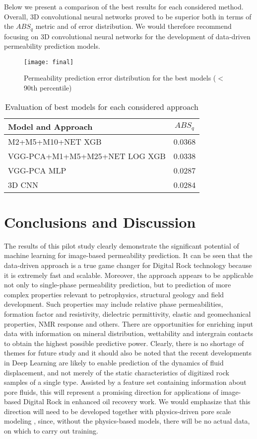 \documentclass[review]{elsarticle}
\begin{document}
Below we present a comparison of the best results for each considered method. Overall, 3D convolutional neural networks proved to be superior both in terms of the $ABS_q$ metric and of error distribution. We would therefore recommend focusing on 3D convolutional neural networks for the development of data-driven permeability prediction models.

\begin{figure}[H]
    \centering
  \texttt{[image: final]}
    \caption{Permeability prediction error distribution for the best models ($<$ 90th percentile)}
\end{figure}

\begin{table}[H]
  \centering
  \caption{Evaluation of best models for each considered approach} \label{tab:tab7}
  \begin{tabular}{ | l | c | }
    \hline
    Model and Approach & $ABS_q$ \\ \hline
    M2+M5+M10+NET XGB & 0.0368 \\ \hline
    VGG-PCA+M1+M5+M25+NET LOG XGB & 0.0338 \\ \hline
    VGG-PCA MLP & 0.0287 \\ \hline
    3D CNN & 0.0284 \\ \hline
  \end{tabular}
\end{table}

\section{Conclusions and Discussion}

The results of this pilot study clearly demonstrate the significant potential of machine learning for image-based permeability prediction. It can be seen that the data-driven approach is a true game changer for Digital Rock technology because it is extremely fast and scalable. Moreover, the approach appears to be applicable not only to single-phase permeability prediction, but to prediction of more complex properties relevant to petrophysics, structural geology and field development. Such properties may include relative phase permeabilities, formation factor and resistivity, dielectric permittivity, elastic and geomechanical properties, NMR response and others. There are opportunities for enriching input data with information on mineral distribution, wettability and intergrain contacts to obtain the highest possible predictive power.
Clearly, there is no shortage of themes for future study and it should also be noted that the recent developments in Deep Learning are likely to enable prediction of the dynamics of fluid displacement, and not merely of the static characteristics of digitized rock samples of a single type. Assisted by a feature set containing information about pore fluids, this will represent a promising direction for applications of image-based Digital Rock in enhanced oil recovery work. We would emphasize that this direction will need to be developed together with physics-driven pore scale modeling \cite{koroteev2014direct}, since, without the physics-based models, there will be no actual data, on which to carry out training.
\end{document}
